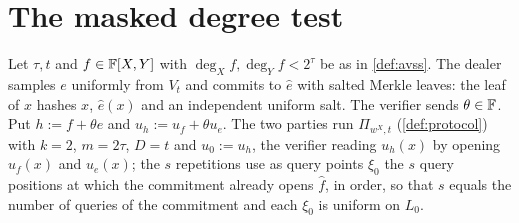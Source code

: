 \section{The masked degree test}

\begin{definition}\label{con:avss-mask}
Let $\tau,t$ and $f\in\mathbb{F}[X,Y]$ with $\deg_Xf,\deg_Yf<2^\tau$ be as in \cref{def:avss}. The
dealer samples $e$ uniformly from $V_t$ and commits to $\hat e$ with salted Merkle leaves: the
leaf of $x$ hashes $x$, $\hat e(x)$ and an independent uniform salt. The verifier sends
$\theta\in\mathbb{F}$. Put $h:=f+\theta e$ and $u_h:=u_f+\theta u_e$. The two parties run
$\Pi_{w^X,t}$ (\cref{def:protocol}) with $k=2$, $m=2\tau$, $D=t$ and $u_0:=u_h$, the verifier
reading $u_h(x)$ by opening $u_f(x)$ and $u_e(x)$; the $s$
repetitions use as query points $\xi_0$ the $s$ query positions at which the commitment already opens $\hat f$, in order, so that $s$ equals the number of queries of the commitment and each $\xi_0$ is uniform on $L_0$.
\end{definition}

